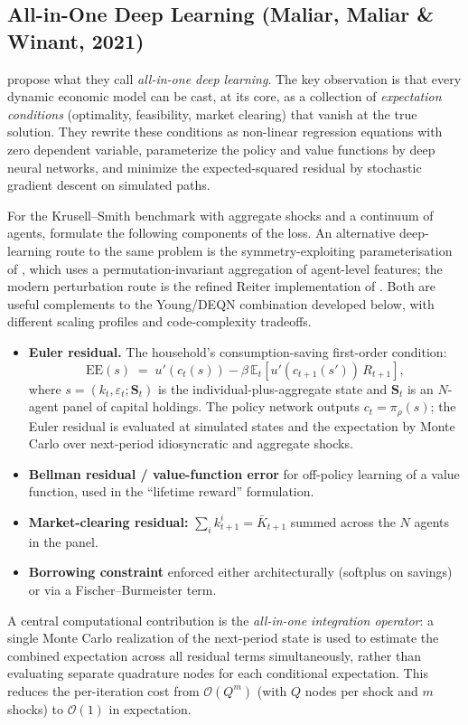 \documentclass[11pt,a4paper]{report}
\begin{document}
\subsection{All-in-One Deep Learning (Maliar, Maliar \& Winant, 2021)}
\label{sec:mmw_ks}

\citet{maliar2021deep} propose what they call \emph{all-in-one deep learning}.  The key observation is that every dynamic economic model can be cast, at its core, as a collection of \emph{expectation conditions} (optimality, feasibility, market clearing) that vanish at the true solution.  They rewrite these conditions as non-linear regression equations with zero dependent variable, parameterize the policy and value functions by deep neural networks, and minimize the expected-squared residual by stochastic gradient descent on simulated paths.

For the Krusell--Smith benchmark with aggregate shocks and a continuum of agents, \citet{maliar2021deep} formulate the following components of the loss.  An alternative deep-learning route to the same problem is the symmetry-exploiting parameterisation of \citet{kahou2021exploiting}, which uses a permutation-invariant aggregation of agent-level features; the modern perturbation route is the refined Reiter implementation of \citet{bayer2020solving}.  Both are useful complements to the Young/DEQN combination developed below, with different scaling profiles and code-complexity tradeoffs.
\begin{itemize}[itemsep=2pt]
\item \textbf{Euler residual.}  The household's consumption-saving first-order condition:
\begin{equation}
\mathrm{EE}(s) \;=\; u'(c_t(s)) - \beta\,\mathbb{E}_{t}\!\left[u'(c_{t+1}(s'))\,R_{t+1}\right],
\end{equation}
where $s = (k_t,\varepsilon_t; \bm{S}_t)$ is the individual-plus-aggregate state and $\bm{S}_t$ is an $N$-agent panel of capital holdings.  The policy network outputs $c_t = \pi_\rho(s)$; the Euler residual is evaluated at simulated states and the expectation by Monte Carlo over next-period idiosyncratic and aggregate shocks.
\item \textbf{Bellman residual / value-function error} for off-policy learning of a value function, used in the ``lifetime reward'' formulation.
\item \textbf{Market-clearing residual:} $\sum_i k_{t+1}^i = \bar K_{t+1}$ summed across the $N$ agents in the panel.
\item \textbf{Borrowing constraint} enforced either architecturally (softplus on savings) or via a Fischer--Burmeister term.
\end{itemize}
A central computational contribution is the \emph{all-in-one integration operator}: a single Monte Carlo realization of the next-period state is used to estimate the combined expectation across all residual terms simultaneously, rather than evaluating separate quadrature nodes for each conditional expectation.  This reduces the per-iteration cost from $\mathcal{O}(Q^m)$ (with $Q$ nodes per shock and $m$ shocks) to $\mathcal{O}(1)$ in expectation.
\end{document}
